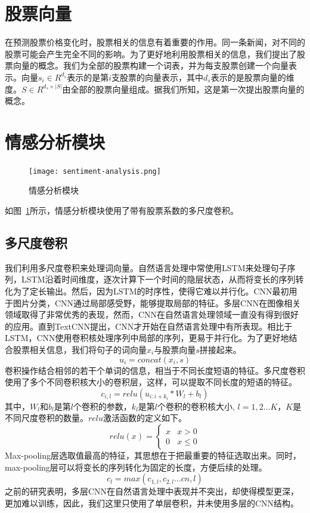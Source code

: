 \section{股票向量}
在预测股票价格变化时，股票相关的信息有着重要的作用。同一条新闻，对不同的股票可能会产生完全不同的影响。为了更好地利用股票相关的信息，我们提出了股票向量的概念。我们为全部的股票构建一个词表，并为每支股票创建一个向量表示。向量$s_i\in R ^ {d_s}$表示的是第$i$支股票的向量表示，其中$d_s$表示的是股票向量的维度。$S\in R ^ {d_s\times | S |}$由全部的股票向量组成。据我们所知，这是第一次提出股票向量的概念。
\section{情感分析模块}

\begin{figure}[ht]
    \centering
    \texttt{[image: sentiment-analysis.png]}
    \caption{情感分析模块}
    \label{fig: sentiment}
\end{figure}

如图~\ref{fig: sentiment}所示，情感分析模块使用了带有股票系数的多尺度卷积。

\subsection{多尺度卷积}
我们利用多尺度卷积来处理词向量。自然语言处理中常使用LSTM来处理句子序列，LSTM沿着时间维度，逐次计算下一个时间的隐层状态，从而将变长的序列转化为了定长输出。然后，因为LSTM的时序性，使得它难以并行化。CNN最初用于图片分类，CNN通过局部感受野，能够提取局部的特征。多层CNN在图像相关领域取得了非常优秀的表现，然而，CNN在自然语言处理领域一直没有得到很好的应用。直到TextCNN\cite{kim2014convolutional}提出，CNN才开始在自然语言处理中有所表现。相比于LSTM，CNN使用卷积核处理序列中局部的序列，更易于并行化。为了更好地结合股票相关信息，我们将句子的词向量$x_i$与股票向量$s$拼接起来。
\begin{equation}
    u_i = concat(x_i, s)
\end{equation}
卷积操作结合相邻的若干个单词的信息，相当于不同长度短语的特征。多尺度卷积使用了多个不同卷积核大小的卷积层，这样，可以提取不同长度的短语的特征。
\begin{equation}
    c_{i, l} = relu(u_{i: i+k_l}*W_l+b_l)
\end{equation}
其中，$W_l$和$b_l$是第$l$个卷积的参数，$k_l$是第$l$个卷积的卷积核大小, $l = 1, 2...K$，$K$是不同尺度卷积的数量。$relu$激活函数的定义如下。
\begin{equation}
    relu(x) =\begin{cases}
        x & x > 0 \\
        0 & x\le 0
    \end{cases}
\end{equation}
Max-pooling层选取值最高的特征，其思想在于把最重要的特征选取出来。同时，max-pooling层可以将变长的序列转化为固定的长度，方便后续的处理。
\begin{equation}
    c_l = max(c_{1, l}, c_{2, l}...c{n, l})
\end{equation}
之前的研究表明\cite{kim2014convolutional}，多层CNN在自然语言处理中表现并不突出，却使得模型更深，更加难以训练，因此，我们这里只使用了单层卷积，并未使用多层的CNN结构。
